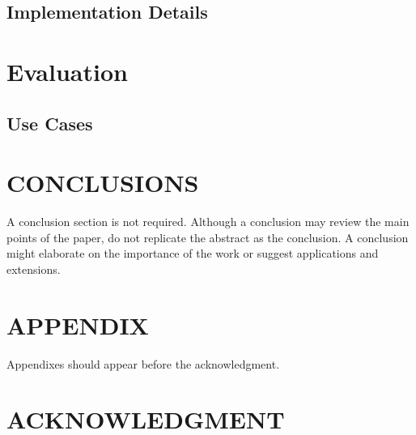 \documentclass[letterpaper, 10 pt, conference]{ieeeconf}  %
\begin{document}
\subsection{Implementation Details}

\section{Evaluation}
\subsection{Use Cases}


\section{CONCLUSIONS}

A conclusion section is not required. Although a conclusion may review the main points of the paper, do not replicate the abstract as the conclusion. A conclusion might elaborate on the importance of the work or suggest applications and extensions. 

\addtolength{\textheight}{-12cm}   %







\section*{APPENDIX}

Appendixes should appear before the acknowledgment.

\section*{ACKNOWLEDGMENT}
\end{document}
